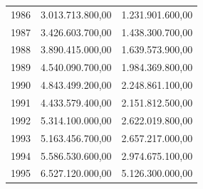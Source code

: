 \documentclass[a4paper,openright,12pt]{book}
\begin{document}
\begin{table}[]
\begin{tabular}{@{}lrr@{}}
1986 & 3.013.713.800,00                                                                                                      & 1.231.901.600,00                                                                                                      \\
1987 & 3.426.603.700,00                                                                                                      & 1.438.300.700,00                                                                                                      \\
1988 & 3.890.415.000,00                                                                                                      & 1.639.573.900,00                                                                                                      \\
1989 & 4.540.090.700,00                                                                                                      & 1.984.369.800,00                                                                                                      \\
1990 & 4.843.499.200,00                                                                                                      & 2.248.861.100,00                                                                                                      \\
1991 & 4.433.579.400,00                                                                                                      & 2.151.812.500,00                                                                                                      \\
1992 & 5.314.100.000,00                                                                                                      & 2.622.019.800,00                                                                                                      \\
1993 & 5.163.456.700,00                                                                                                      & 2.657.217.000,00                                                                                                      \\
1994 & 5.586.530.600,00                                                                                                      & 2.974.675.100,00                                                                                                      \\
1995 & 6.527.120.000,00                                                                                                      & 5.126.300.000,00                                                                                                      \\

\end{tabular}
\end{table}
\end{document}
